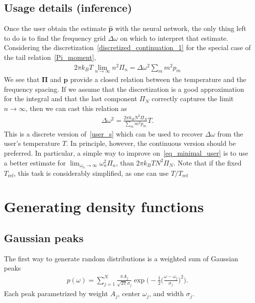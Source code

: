 \documentclass[notitlepage,11pt,nofootinbib]{revtex4-1}
\renewcommand{\vec}[1]{\bm{#1}}
\begin{document}
\subsection{Usage details (inference)}

Once the user obtain the estimate $\hat{\vec p}$ with the neural network, the only thing left to do is to find the frequency grid $\Delta\omega$ on which to interpret that estimate. Considering the discretization~\eqref{discretized_continuation_1} for the special case of the tail relation~\eqref{Pi_moment},
\begin{align}
    2\pi k_B T \lim_{n\rightarrow \infty}n^2 \Pi_n = \Delta\omega^2 \sum_m m^2 p_m
\end{align}
We see that $\vec \Pi$ and $\vec p$ provide a closed relation between the temperature and the frequency spacing. If we assume that the discretization is a good approximation for the integral and that the last component $\Pi_N$ correctly captures the limit $n\rightarrow\infty$, then we can cast this relation as
\begin{align}
    \Delta\omega^2 = 
    \frac{
        2\pi k_B 
        N^2 \Pi_N
    }{
        \sum_m m^2 p_m
    }
    T.
\label{eq_minimal_user}
\end{align}
This is a discrete version of~\eqref{user_s} which can be used to recover $\Delta\omega$ from the user's temperature $T$. In principle, however, the continuous version should be preferred. In particular, a simple way to improve on~\eqref{eq_minimal_user} is to use a better estimate for $\lim_{\omega_n\rightarrow \infty}\omega_n^2 \Pi_n$, than $2\pi k_B T N^2\Pi_N$. Note that if the fixed $T_{\text{ref}}$, this task is considerably simplified, as one can use $T/T_{\text{ref}}$

\section{Generating density functions}
\label{sec_distribution}
\subsection{Gaussian peaks}
The first way to generate random distributions is a weighted sum of Gaussian peaks 
\begin{align}
p(\omega)
=
\sum_{j=1}^{N} 
\frac{\pi A_j}{\sqrt{2\pi} \sigma_j}
\exp\bigg(-\frac{1}{2}\Big(\frac{\omega-\omega_j}{\sigma_j}\Big)^2\bigg).
\end{align}
Each peak parametrized by weight $A_j$, center $\omega_j$, and width $\sigma_j$.
\end{document}
